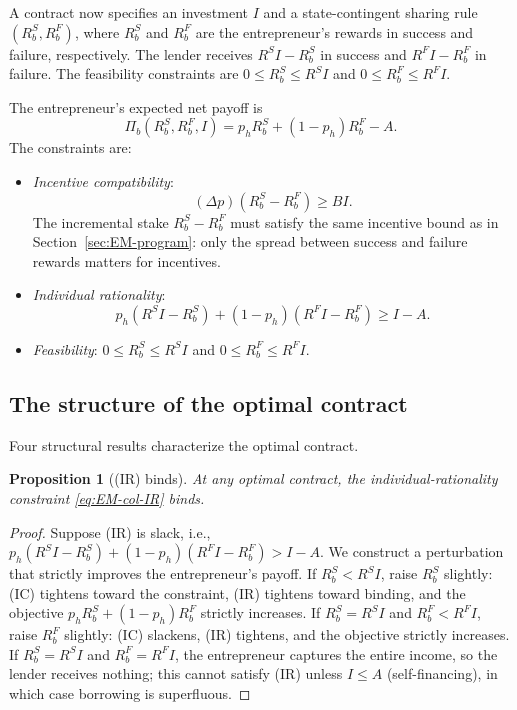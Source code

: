 \documentclass[11pt,a4paper,oneside]{book}
\def\leq{\leqslant}
\def\geq{\geqslant}
\theoremstyle{plain}
\newtheorem{proposition}[theorem]{Proposition}
\theoremstyle{definition}
\theoremstyle{remark}
\numberwithin{equation}{chapter}
\begin{document}
A contract now specifies an investment $I$ and a state-contingent sharing rule $(R_b^S, R_b^F)$, where $R_b^S$ and $R_b^F$ are the entrepreneur's rewards in success and failure, respectively.
The lender receives $R^S I - R_b^S$ in success and $R^F I - R_b^F$ in failure.
The feasibility constraints are $0 \leq R_b^S \leq R^S I$ and $0 \leq R_b^F \leq R^F I$.

The entrepreneur's expected net payoff is
\begin{equation}\label{eq:EM-col-objective}
  \Pi_b(R_b^S, R_b^F, I) = p_h R_b^S + (1 - p_h) R_b^F - A.
\end{equation}
The constraints are:

\begin{itemize}
  \item \emph{Incentive compatibility}:
  \begin{equation}\label{eq:EM-col-IC}
    (\Delta p)(R_b^S - R_b^F) \geq B I.
    \tag{IC}
  \end{equation}
  The incremental stake $R_b^S - R_b^F$ must satisfy the same incentive bound as in Section~\ref{sec:EM-program}: only the spread between success and failure rewards matters for incentives.
  \item \emph{Individual rationality}:
  \begin{equation}\label{eq:EM-col-IR}
    p_h (R^S I - R_b^S) + (1 - p_h)(R^F I - R_b^F) \geq I - A.
    \tag{IR}
  \end{equation}
  \item \emph{Feasibility}: $0 \leq R_b^S \leq R^S I$ and $0 \leq R_b^F \leq R^F I$.
\end{itemize}

\subsection{The structure of the optimal contract}

Four structural results characterize the optimal contract.

\begin{proposition}[(IR) binds]\label{prop:EM-col-IR-binds}
At any optimal contract, the individual-rationality constraint \eqref{eq:EM-col-IR} binds.
\end{proposition}

\begin{proof}
Suppose (IR) is slack, i.e., $p_h(R^S I - R_b^S) + (1 - p_h)(R^F I - R_b^F) > I - A$.
We construct a perturbation that strictly improves the entrepreneur's payoff.
If $R_b^S < R^S I$, raise $R_b^S$ slightly: (IC) tightens toward the constraint, (IR) tightens toward binding, and the objective $p_h R_b^S + (1-p_h) R_b^F$ strictly increases.
If $R_b^S = R^S I$ and $R_b^F < R^F I$, raise $R_b^F$ slightly: (IC) slackens, (IR) tightens, and the objective strictly increases.
If $R_b^S = R^S I$ and $R_b^F = R^F I$, the entrepreneur captures the entire income, so the lender receives nothing; this cannot satisfy (IR) unless $I \leq A$ (self-financing), in which case borrowing is superfluous.
\end{proof}
\end{document}
